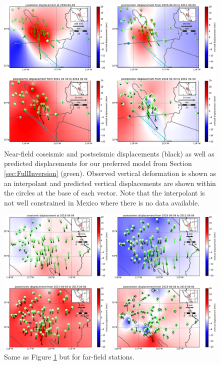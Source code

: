 \documentclass[review]{elsarticle}
\begin{document}
\begin{figure}
\includegraphics[scale=0.7]{Figures/MapViewNearField}
\centering 
\caption{Near-field coseismic and postseismic displacements (black) as well as predicted displacements for our preferred model from Section \ref{sec:FullInversion} (green).  Observed vertical deformation is shown as an interpolant and predicted vertical displacements are shown within the circles at the base of each vector.  Note that the interpolant is not well constrained in Mexico where there is no data available.}
\label{fig:NearField}
\end{figure}

\begin{figure}
\includegraphics[scale=0.7]{Figures/MapViewFarField}
\centering 
\caption{Same as Figure \ref{fig:NearField} but for far-field stations.}
\label{fig:FarField}
\end{figure}
\end{document}
